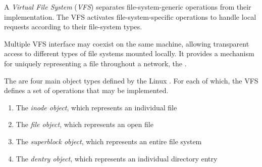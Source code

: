 \begin{definition}\label{def:Virtual_File_System}
  A \emph{Virtual File System} (\emph{VFS}) separates file-system-generic operations from their implementation.
  The VFS activates file-system-specific operations to handle local requests according to their file-system types.

  Multiple VFS interface may coexist on the same machine, allowing transparent access to different types of file systems mounted locally.
  It provides a mechanism for uniquely representing a file throughout a network, the .
\end{definition}

The are four main object types defined by the Linux .
For each of which, the VFS defines a set of operations that may be implemented.
\begin{enumerate}[noitemsep]
\item The \emph{inode object}, which represents an individual file
\item The \emph{file object}, which represents an open file
\item The \emph{superblock object}, which represents an entire file system
\item The \emph{dentry object}, which represents an individual directory entry
\end{enumerate}


